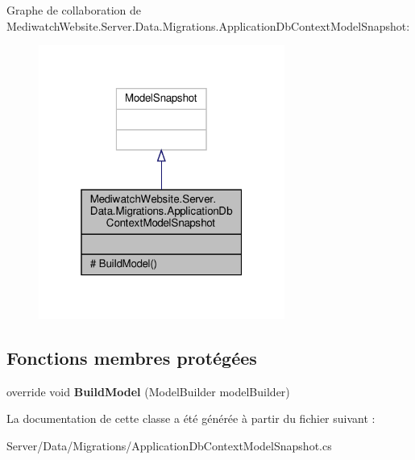 Graphe de collaboration de Mediwatch\+Website.\+Server.\+Data.\+Migrations.\+Application\+Db\+Context\+Model\+Snapshot\+:
\nopagebreak
\begin{figure}[H]
\begin{center}
\leavevmode
\includegraphics[width=229pt]{class_mediwatch_website_1_1_server_1_1_data_1_1_migrations_1_1_application_db_context_model_snapshot__coll__graph}
\end{center}
\end{figure}
\subsection*{Fonctions membres protégées}
\begin{DoxyCompactItemize}
\item 
\mbox{\label{class_mediwatch_website_1_1_server_1_1_data_1_1_migrations_1_1_application_db_context_model_snapshot_a2cb0055d80d12c9613b87de79eb330fb}} 
override void {\bfseries Build\+Model} (Model\+Builder model\+Builder)
\end{DoxyCompactItemize}


La documentation de cette classe a été générée à partir du fichier suivant \+:\begin{DoxyCompactItemize}
\item 
Server/\+Data/\+Migrations/Application\+Db\+Context\+Model\+Snapshot.\+cs\end{DoxyCompactItemize}
